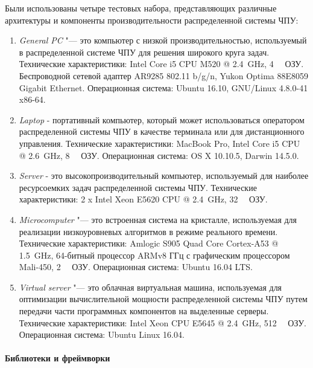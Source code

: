 Были использованы четыре тестовых набора, представляющих различные архитектуры и компоненты производительности распределенной системы ЧПУ:

\begin{enumerate}
	\item \textit{General PC} "--- это компьютер с низкой производительностью, используемый в распределенной системе ЧПУ для решения широкого круга задач. Технические характеристики: Intel Core i5 CPU M520 @ \SI{2,4}{\giga\hertz}, \SI{4}{\gibi\byte} ОЗУ. Беспроводной сетевой адаптер AR9285 802.11 b/g/n, Yukon Optima 88E8059 Gigabit Ethernet. Операционная система: Ubuntu 16.10, GNU/Linux 4.8.0-41 x86-64.
	
	\item \textit{Laptop} - портативный компьютер, который может использоваться оператором распределенной системы ЧПУ в качестве терминала или для дистанционного управления. Технические характеристики: MacBook Pro, Intel Core i5 CPU @ \SI{2,6}{\giga\hertz}, \SI{8}{\gibi\byte} ОЗУ.
	Операционная система: OS X 10.10.5, Darwin 14.5.0.
	\item \textit{Server} - это высокопроизводительный компьютер, используемый для наиболее ресурсоемких задач распределенной системы ЧПУ. Технические характеристики: 2 x Intel Xeon E5620 CPU @ \SI{2,4}{\giga\hertz}, \SI{32}{\gibi\byte} ОЗУ.
	
	\item \textit{Microcomputer} "--- это встроенная система на кристалле, используемая для реализации низкоуровневых алгоритмов в режиме реального времени. Технические характеристики: Amlogic S905 Quad Core Cortex-A53 @ \SI{1,5}{\giga\hertz}, 64-битный процессор ARMv8 ГГц с графическим процессором Mali-450, \SI{2}{\gibi\byte} ОЗУ.
	Операционная система: Ubuntu 16.04 LTS.
	
	\item \textit{Virtual server} "--- это облачная виртуальная машина, используемая для оптимизации вычислительной мощности распределенной системы ЧПУ путем передачи части программных компонентов на выделенные серверы. Технические характеристики: Intel Xeon CPU E5645 @ \SI{2,4}{\giga\hertz}, \SI{512}{\mebi\byte} ОЗУ. Операционная система: Ubuntu Linux 16.04.
\end{enumerate}

\paragraph{Библиотеки и фреймворки}


